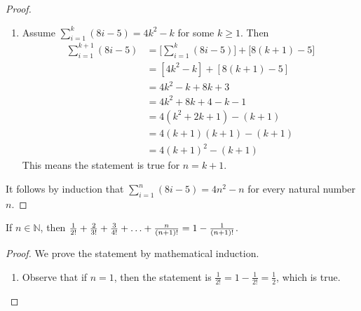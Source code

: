 \documentclass[DIN, pagenumber=false, fontsize=11pt, parskip=half]{scrartcl}
\begin{document}
\begin{problems}
\begin{proof}
\begin{enumerate}
            \item Assume $\sum\limits^{k}_{i=1}(8i-5) = 4k^2-k$ for some $k \geq 1$. Then
                \begin{align*}
                    \sum\limits^{k+1}_{i=1}(8i-5) &= \bigg[\sum\limits^{k}_{i=1}(8i-5)\bigg] + \bigg[8(k+1)-5\bigg]\\
                                                  &= [4k^2-k] + [8(k+1)-5]\\
                                                  &= 4k^2-k+8k+3\\
                                                  &= 4k^2+8k+4-k-1\\
                                                  &= 4(k^2+2k+1)-(k+1)\\
                                                  &= 4(k+1)(k+1)-(k+1)\\
                                                  &= 4(k+1)^2-(k+1)
                \end{align*}
                This means the statement is true for $n = k + 1$.
        \end{enumerate}
        It follows by induction that $\sum\limits^{n}_{i=1}(8i-5) = 4n^2-n$ for every natural number $n$.
    \end{proof}

    \problem If $n \in \mathbb{N}$, then $\frac{1}{2!}+\frac{2}{3!}+\frac{3}{4!}+\mathellipsis+\frac{n}{(n+1)!} = 1 - \frac{1}{(n+1)!}$.
    \begin{proof}
        We prove the statement by mathematical induction.
        \begin{enumerate}
            \item Observe that if $n=1$, then the statement is $\frac{1}{2!} = 1 - \frac{1}{2!} = \frac{1}{2}$, which is true.


\end{enumerate}
\end{proof}
\end{problems}
\end{document}
